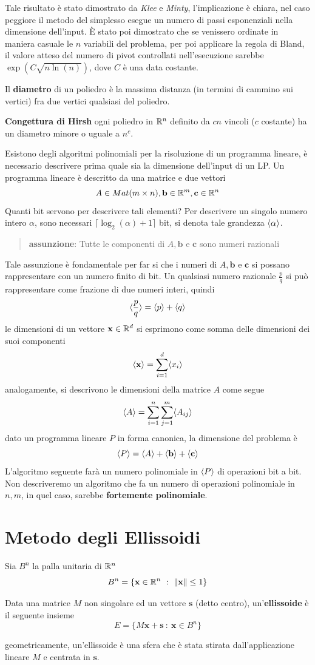 \documentclass[10pt, letterpaper]{report}
\newcommand{\bb}{{\mathbf{b}}}
\newcommand{\bs}{{\mathbf{s}}}
\newcommand{\bc}{{\mathbf{c}}}
\newcommand{\x}{{\mathbf{x}}}
\begin{document}
Tale risultato è stato dimostrato da  \textit{Klee} e \textit{Minty}, l'implicazione è chiara, nel caso peggiore il metodo del simplesso esegue un numero di passi esponenziali nella dimensione dell'input. È stato poi dimostrato che se venissero ordinate in maniera casuale le $n$ variabili del problema, per poi applicare la regola di Bland, il valore atteso del numero di pivot controllati nell'esecuzione sarebbe $\exp(C\sqrt{n\ln{(n)}})$, dove $C$ è una data costante.
\begin{definizione}
    Il \textbf{diametro} di un poliedro è la massima distanza (in termini di cammino sui vertici) fra due vertici qualsiasi del poliedro.
\end{definizione}
\textbf{Congettura di Hirsh} ogni poliedro in ${\mathbb R}^n$ definito da $cn$ vincoli ($c$ costante) ha un diametro minore o uguale a $n^c$.\bigskip 

Esistono degli algoritmi polinomiali per la risoluzione di un programma lineare, è necessario descrivere prima quale sia la dimensione dell'input di un LP. Un programma lineare è descritto da una matrice e due vettori 
$$ A\in Mat(m\times n),\bb\in \R^m,\bc\in\R^n$$
Quanti bit servono per descrivere tali elementi? Per descrivere un singolo numero intero $\alpha$, sono necessari 
$ \lceil \log_2(\alpha)+1 \rceil $ bit, si denota tale grandezza $\langle \alpha \rangle$.\begin{quote}
    \textbf{assunzione}: Tutte le componenti di $A,\bb$ e $\bc$ sono numeri razionali
\end{quote}
Tale assunzione è fondamentale per far si che i numeri di  $A,\bb$ e $\bc$ si possano rappresentare con un numero finito di bit. Un qualsiasi numero razionale $\frac{p}{q}$ si può rappresentare come frazione di due numeri interi, quindi
$$ \langle \frac{p}{q} \rangle=\langle p \rangle+\langle q \rangle$$
le dimensioni di un vettore $\x\in\R^d$ si esprimono come somma delle dimensioni dei suoi componenti 
$$ \bra\x=\sum_{i=1}^d\bra{x_i}$$
analogamente, si descrivono le dimensioni della matrice $A$ come segue 
$$\langle A \rangle=\sum_{i=1}^n\sum_{j=1}^m\langle A_{ij} \rangle$$
dato un programma lineare $P$ in forma canonica, la dimensione del problema è
$$ \bra P = \bra A +\bra\bb+\bra\bc$$
L'algoritmo seguente farà un numero polinomiale in $\langle P \rangle$ di operazioni bit a bit. Non descriveremo un algoritmo che fa un numero di operazioni polinomiale in $n,m$, in quel caso, sarebbe \textbf{fortemente polinomiale}.
\section{Metodo degli Ellissoidi}
Sia $B^n$ la palla unitaria di ${\mathbb R}^n$
$$ B^n=\{\x\in\R^n \ : \ \|\x\|\le 1\}$$
\begin{definizione}
    Data una matrice $M$ non singolare ed un vettore $\bs$ (detto centro), un'\textbf{ellissoide}  è il seguente insieme 
    $$ E=\{M\x+\bs \ : \ \x\in B^n\}$$
\end{definizione}
geometricamente, un'ellissoide è una sfera che è stata stirata dall'applicazione lineare $M$ e centrata in $\bs$.
\end{document}
